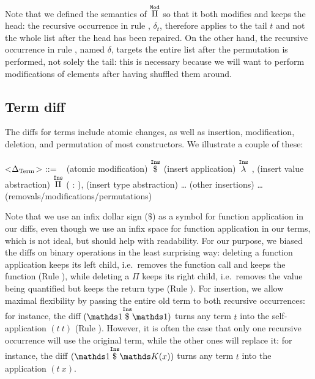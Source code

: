 Note that we defined the semantics of $\overset{\mathtt{Mod}}{\Pi}$ so that it both modifies
and keeps the head: the recursive occurrence in rule ,
$\delta_t$, therefore applies to the tail $t$ and not the whole list after the
head has been repaired.  On the other hand, the recursive occurrence in rule
, named $\delta$, targets the entire list after the
permutation is performed, not solely the tail: this is necessary because we will
want to perform modifications of elements after having shuffled them around.

\subsection{Term diff}\label{chick-diffs-term-diff}

The diffs for terms include atomic changes, as well as insertion, modification,
deletion, and permutation of most constructors.  We illustrate a couple of
these:

\begin{grammar}
<$\DeltaTerm{}$> ::= \ %
\alt {} \hfill (atomic modification)
\alt \synt{$\DeltaTerm{}$} $\overset{\mathtt{Ins}}{ \$ }$ \synt{$\DeltaTerm{}$} \hfill
(insert application)
\alt $\overset{\mathtt{Ins}}{\lambda}$ , \synt{$\DeltaTerm{}$} \hfill (insert value
abstraction)
\alt $\overset{\mathtt{Ins}}{\Pi}$ ( : \synt{$\DeltaTerm{}$}),
\synt{$\DeltaTerm{}$} \hfill (insert type abstraction)
\alt … \hfill (other insertions)
\alt … \hfill (removals/modifications/permutations)
\end{grammar}

\noindent Note that we use an infix dollar sign ($\$$) as a symbol for function
application in our diffs, even though we use an infix space for function
application in our terms, which is not ideal, but should help with readability.
For our purpose, we biased the diffs on binary operations in the least
surprising way: deleting a function application keeps its left child, i.e.\
removes the function call and keeps the function (Rule ), while
deleting a $\Pi$ keeps its right child, i.e.\ removes the value being quantified
but keeps the return type (Rule \rulename{\RmPi}).  For insertion, we allow
maximal flexibility by passing the entire old term to both recursive
occurrences: for instance, the diff $(\MathInsApp{\MathSame}{\MathSame})$ turns
any term $t$ into the self-application $(t\ t)$ (Rule \rulename{\InsApp}).
However, it is often the case that only one recursive occurrence will use the
original term, while the other ones will replace it: for instance, the diff
$(\MathInsApp{\MathSame}{\MathReplace{x}})$ turns any term $t$ into the
application $(t\ x)$.

